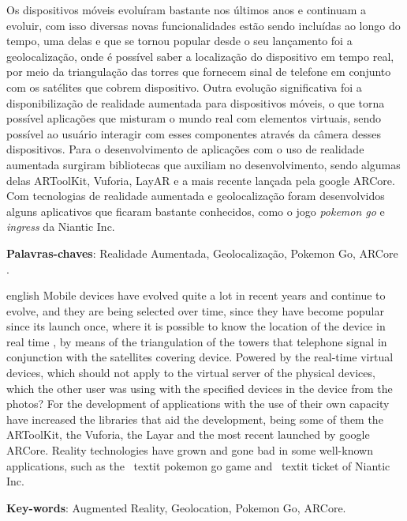 
\setlength{\absparsep}{18pt} %
\begin{resumo}
		Os dispositivos móveis evoluíram bastante nos últimos anos e continuam a evoluir, com isso diversas novas funcionalidades estão sendo incluídas ao longo do tempo, uma delas e que se tornou popular desde o seu lançamento foi a geolocalização, onde é possível saber a localização do dispositivo em tempo real, por meio da triangulação das torres que fornecem sinal de telefone em conjunto com os satélites que cobrem dispositivo. Outra evolução significativa foi a disponibilização de realidade aumentada para dispositivos móveis, o que torna possível aplicações que misturam o mundo real com elementos virtuais, sendo possível ao usuário interagir com esses componentes através da câmera desses dispositivos. Para o desenvolvimento de aplicações com o uso de realidade aumentada surgiram bibliotecas que auxiliam no desenvolvimento, sendo algumas delas ARToolKit, Vuforia, LayAR e a mais recente lançada pela google ARCore. Com tecnologias de realidade aumentada e geolocalização foram desenvolvidos alguns aplicativos que ficaram bastante conhecidos, como o jogo \textit{pokemon go} e \textit{ingress} da Niantic Inc. 
 
 \textbf{Palavras-chaves}: Realidade Aumentada, Geolocalização, Pokemon Go, ARCore  .
 
\end{resumo}

\begin{resumo}[Abstract]
 \begin{otherlanguage*}{english}
 Mobile devices have evolved quite a lot in recent years and continue to evolve, and they are being selected over time, since they have become popular since its launch once, where it is possible to know the location of the device in real time , by means of the triangulation of the towers that telephone signal in conjunction with the satellites covering device. Powered by the real-time virtual devices, which should not apply to the virtual server of the physical devices, which the other user was using with the specified devices in the device from the photos? For the development of applications with the use of their own capacity have increased the libraries that aid the development, being some of them the ARToolKit, the Vuforia, the Layar and the most recent launched by google ARCore. Reality technologies have grown and gone bad in some well-known applications, such as the \ textit {pokemon go} game and \ textit {ticket} of Niantic Inc.
   \vspace{\onelineskip}
 
   \noindent 
   \textbf{Key-words}: Augmented Reality, Geolocation, Pokemon Go, ARCore.
 \end{otherlanguage*}
\end{resumo}


